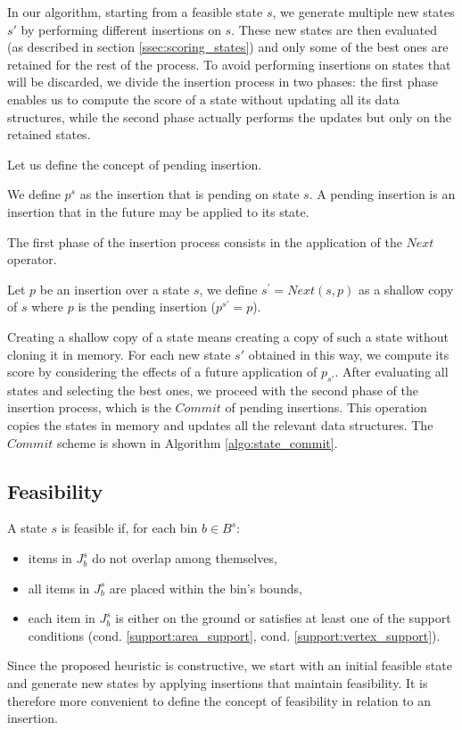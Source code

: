 In our algorithm, starting from a feasible state $s$, we generate multiple new states $s'$ by performing different insertions on $s$. These new states are then evaluated (as described in section \ref{ssec:scoring_states}) and only some of the best ones are retained for the rest of the process. To avoid performing insertions on states that will be discarded, we divide the insertion process in two phases: the first phase enables us to compute the score of a state without updating all its data structures, while the second phase actually performs the updates but only on the retained states. 

Let us define the concept of pending insertion.
\begin{definition}
    We define $p^s$ as the insertion that is pending on state $s$. A pending insertion is an insertion that in the future may be applied to its state.
\end{definition}
The first phase of the insertion process consists in the application of the $Next$ operator.
\begin{definition}[Next]
    \label{def:state_next}%
    Let $p$ be an insertion over a state $s$, we define $s^\prime = Next(s, p)$ as a shallow copy of $s$ where $p$ is the pending insertion ($p^{s'} = p$).
\end{definition}
Creating a shallow copy of a state means creating a copy of such a state without cloning it in memory. For each new state $s'$ obtained in this way, we compute its score by considering the effects of a future application of $p_{s'}$. After evaluating all states and selecting the best ones, we proceed with the second phase of the insertion process, which is the $Commit$ of pending insertions. This operation copies the states in memory and updates all the relevant data structures. The $Commit$ scheme is shown in Algorithm \ref{algo:state_commit}.



\subsection{Feasibility}
\label{sec:problem_state:feasibility}%
A state $s$ is feasible if, for each bin $b \in B^s$:
\begin{itemize}
    \item items in $J^s_b$ do not overlap among themselves,
    \item all items in $J^s_b$ are placed within the bin's bounds,
    \item each item in $J^s_b$ is either on the ground or satisfies at least one of the support conditions (cond. \ref{support:area_support}, cond. \ref{support:vertex_support}).
\end{itemize}
Since the proposed heuristic is constructive, we start with an initial feasible state and generate new states by applying insertions that maintain feasibility. It is therefore more convenient to define the concept of feasibility in relation to an insertion.

